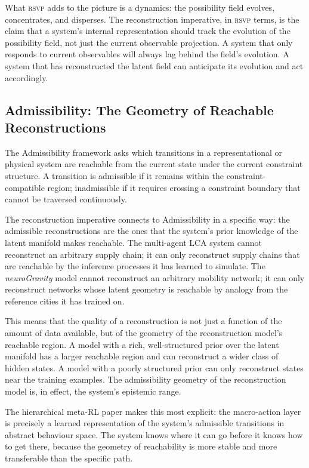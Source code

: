 \documentclass[12pt, letterpaper]{article}
\theoremstyle{remark}
\newcommand{\rsvp}{\textsc{rsvp}}
\newcommand{\neuro}{\textit{neuroGravity}}
\begin{document}
What \rsvp{} adds to the picture is a dynamics: the possibility field
evolves, concentrates, and disperses.  The reconstruction imperative, in
\rsvp{} terms, is the claim that a system's internal representation should
track the evolution of the possibility field, not just the current observable
projection.  A system that only responds to current observables will always
lag behind the field's evolution.  A system that has reconstructed the
latent field can anticipate its evolution and act accordingly.

\subsection{Admissibility: The Geometry of Reachable Reconstructions}

The Admissibility framework asks which transitions in a representational or
physical system are reachable from the current state under the current
constraint structure.  A transition is admissible if it remains within the
constraint-compatible region; inadmissible if it requires crossing a
constraint boundary that cannot be traversed continuously.

The reconstruction imperative connects to Admissibility in a specific way:
the admissible reconstructions are the ones that the system's prior knowledge
of the latent manifold makes reachable.  The multi-agent LCA system cannot
reconstruct an arbitrary supply chain; it can only reconstruct supply chains
that are reachable by the inference processes it has learned to simulate.
The \neuro{} model cannot reconstruct an arbitrary mobility network; it can
only reconstruct networks whose latent geometry is reachable by analogy from
the reference cities it has trained on.

This means that the quality of a reconstruction is not just a function of
the amount of data available, but of the geometry of the reconstruction
model's reachable region.  A model with a rich, well-structured prior over
the latent manifold has a larger reachable region and can reconstruct a
wider class of hidden states.  A model with a poorly structured prior can
only reconstruct states near the training examples.  The admissibility
geometry of the reconstruction model is, in effect, the system's epistemic
range.

The hierarchical meta-RL paper makes this most explicit: the macro-action
layer is precisely a learned representation of the system's admissible
transitions in abstract behaviour space.  The system knows where it can go
before it knows how to get there, because the geometry of reachability is
more stable and more transferable than the specific path.
\end{document}
